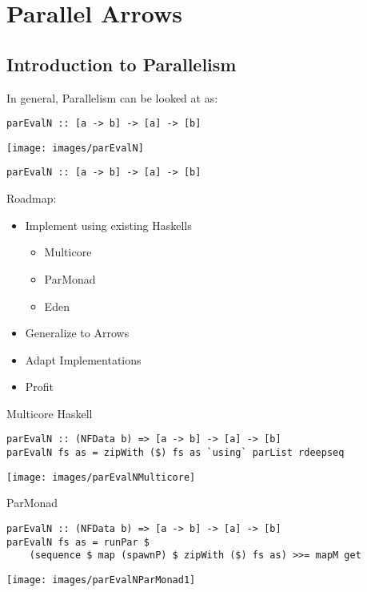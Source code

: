 \section{Parallel Arrows}
\subsection{Introduction to Parallelism}
\begin{frame}[fragile]
In general, Parallelism can be looked at as:
\begin{lstlisting}[frame=htrbl]
parEvalN :: [a -> b] -> [a] -> [b]
\end{lstlisting}
\begin{center}
\texttt{[image: images/parEvalN]}
\end{center}
\end{frame}
\begin{frame}[fragile]
\begin{lstlisting}[frame=htrbl]
parEvalN :: [a -> b] -> [a] -> [b]
\end{lstlisting}
Roadmap:
\begin{itemize}
\item Implement using existing Haskells
\begin{itemize}
\item Multicore
\item ParMonad
\item Eden
\end{itemize}
\item Generalize to Arrows
\item Adapt Implementations
\item Profit
\end{itemize}
\end{frame}

\begin{frame}[fragile]{Multicore Haskell}
\begin{lstlisting}[frame=htrbl]
parEvalN :: (NFData b) => [a -> b] -> [a] -> [b]
parEvalN fs as = zipWith ($) fs as `using` parList rdeepseq
\end{lstlisting}
\begin{center}
	\texttt{[image: images/parEvalNMulticore]}
\end{center}
\end{frame}

\begin{frame}[fragile]{ParMonad}
\begin{lstlisting}[frame=htrbl]
parEvalN :: (NFData b) => [a -> b] -> [a] -> [b]
parEvalN fs as = runPar $ 
	(sequence $ map (spawnP) $ zipWith ($) fs as) >>= mapM get
\end{lstlisting}
\begin{center}
\texttt{[image: images/parEvalNParMonad1]}
\end{center}
\end{frame}

